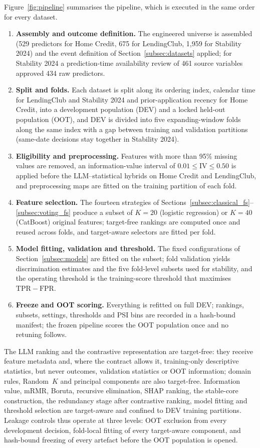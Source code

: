 \documentclass[final,5p,twocolumn]{elsarticle}
\newcommand{\Kfeat}{K}
\newcommand{\TPR}{\mathrm{TPR}}
\newcommand{\FPR}{\mathrm{FPR}}
\begin{document}
Figure~\ref{fig:pipeline} summarises the pipeline, which is executed in the same order for every dataset.
\begin{enumerate}
    \item \textbf{Assembly and outcome definition.} The engineered universe is assembled (529 predictors for Home Credit, 675 for LendingClub, 1,959 for Stability 2024) and the event definition of Section~\ref{subsec:datasets} applied; for Stability 2024 a prediction-time availability review of 461 source variables approved 434 raw predictors.
    \item \textbf{Split and folds.} Each dataset is split along its ordering index, calendar time for LendingClub and Stability 2024 and prior-application recency for Home Credit, into a development population (DEV) and a locked held-out population (OOT), and DEV is divided into five expanding-window folds along the same index with a gap between training and validation partitions (same-date decisions stay together in Stability 2024).
    \item \textbf{Eligibility and preprocessing.} Features with more than 95\% missing values are removed, an information-value interval of $0.01\le\mathrm{IV}\le0.50$ is applied before the LLM--statistical hybrids on Home Credit and LendingClub, and preprocessing maps are fitted on the training partition of each fold.
    \item \textbf{Feature selection.} The fourteen strategies of Sections~\ref{subsec:classical_fs}--\ref{subsec:voting_fs} produce a subset of $\Kfeat=20$ (logistic regression) or $\Kfeat=40$ (CatBoost) original features; target-free rankings are computed once and reused across folds, and target-aware selectors are fitted per fold.
    \item \textbf{Model fitting, validation and threshold.} The fixed configurations of Section~\ref{subsec:models} are fitted on the subset; fold validation yields discrimination estimates and the five fold-level subsets used for stability, and the operating threshold is the training-score threshold that maximises $\TPR-\FPR$.
    \item \textbf{Freeze and OOT scoring.} Everything is refitted on full DEV; rankings, subsets, settings, thresholds and PSI bins are recorded in a hash-bound manifest; the frozen pipeline scores the OOT population once and no retuning follows.
\end{enumerate}
The LLM ranking and the contrastive representation are target-free: they receive feature metadata and, where the contract allows it, training-only descriptive statistics, but never outcomes, validation statistics or OOT information; domain rules, Random~$\Kfeat$ and principal components are also target-free. Information value, mRMR, Boruta, recursive elimination, SHAP ranking, the stable-core construction, the redundancy stage after contrastive ranking, model fitting and threshold selection are target-aware and confined to DEV training partitions. Leakage controls thus operate at three levels: OOT exclusion from every development decision, fold-local fitting of every target-aware component, and hash-bound freezing of every artefact before the OOT population is opened.
\end{document}
